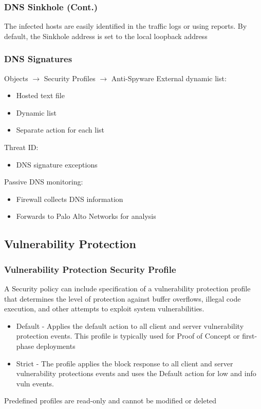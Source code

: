 \subsubsection{DNS Sinkhole (Cont.)}
The infected hosts are easily identified in the traffic logs or using reports.
By  default, the Sinkhole address is set to the local loopback address

\subsubsection{DNS Signatures}
Objects $\rightarrow$ Security Profiles $\rightarrow$ Anti-Spyware
External dynamic list:
	\begin{itemize}
		\item Hosted text file
		\item Dynamic list
		\item Separate action for each list
	\end{itemize}
Threat ID:
	\begin{itemize}
		\item DNS signature exceptions
	\end{itemize}
Passive DNS monitoring:
	\begin{itemize}
		\item Firewall collects DNS information
		\item Forwards to Palo Alto Networks for analysis
	\end{itemize}


\subsection{Vulnerability Protection}
\subsubsection{Vulnerability Protection Security Profile}
A Security policy can include specification of a vulnerability protection profile that determines the level of protection against buffer overflows, illegal code execution, and other attempts to exploit system vulnerabilities.
	\begin{itemize}
		\item Default - Applies the default action to all client and server vulnerability protection events. This profile is typically used for Proof of Concept or first-phase deployments

		\item Strict - The profile applies the block response to all client and server vulnerability protections events and uses the Default action for low and info vuln events.
	\end{itemize}
Predefined profiles are read-only and cannot be modified or deleted

